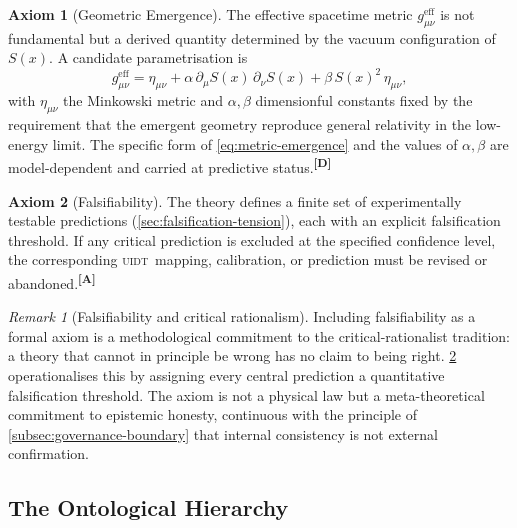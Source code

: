 \documentclass[12pt,a4paper,twoside]{article}
\theoremstyle{plain}
\theoremstyle{definition}
\newtheorem{axiom}{Axiom}
\theoremstyle{remark}
\newtheorem{remark}[theorem]{Remark}
\newcommand{\UIDT}{\textsc{uidt}}
\newcommand{\catmark}[1]{\textsuperscript{\textsf{\textbf{[#1]}}}}
\newcommand{\Sx}{S(x)}
\begin{document}
\begin{axiom}[Geometric Emergence]
\label{ax:emergence}
The effective spacetime metric $g_{\mu\nu}^{\mathrm{eff}}$ is not fundamental but a derived quantity determined by the vacuum configuration of $\Sx$. A candidate parametrisation is
\begin{equation}
 g_{\mu\nu}^{\mathrm{eff}} = \eta_{\mu\nu}
 + \alpha\,\partial_\mu\Sx\,\partial_\nu\Sx
 + \beta\,\Sx^2\,\eta_{\mu\nu},
 \label{eq:metric-emergence}
\end{equation}
with $\eta_{\mu\nu}$ the Minkowski metric and $\alpha,\beta$ dimensionful constants fixed by the requirement that the emergent geometry reproduce general relativity in the low-energy limit. The specific form of \cref{eq:metric-emergence} and the values of $\alpha,\beta$ are model-dependent and carried at predictive status.\catmark{D}
\end{axiom}

\begin{axiom}[Falsifiability]
\label{ax:falsifiability}
The theory defines a finite set of experimentally testable predictions (\cref{sec:falsification-tension}), each with an explicit falsification threshold. If any critical prediction is excluded at the specified confidence level, the corresponding \UIDT\ mapping, calibration, or prediction must be revised or abandoned.\catmark{A}
\end{axiom}

\begin{remark}[Falsifiability and critical rationalism]
\label{rem:popper}
Including falsifiability as a formal axiom is a methodological commitment to the critical-rationalist tradition: a theory that cannot in principle be wrong has no claim to being right. \cref{ax:falsifiability} operationalises this by assigning every central prediction a quantitative falsification threshold. The axiom is not a physical law but a meta-theoretical commitment to epistemic honesty, continuous with the principle of \cref{subsec:governance-boundary} that internal consistency is not external confirmation.
\end{remark}

\subsection{The Ontological Hierarchy}
\label{subsec:ontological-hierarchy}
\end{document}
